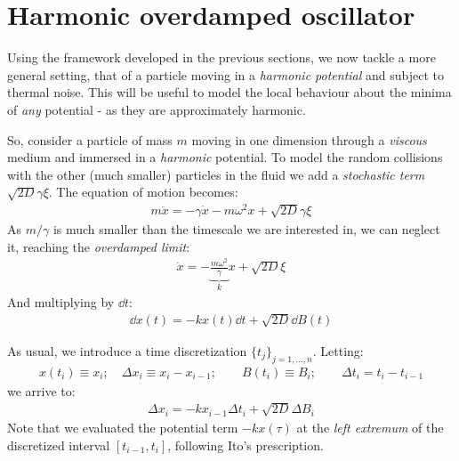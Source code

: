 \documentclass[../template.tex]{subfiles}
\begin{document}
\section{Harmonic overdamped oscillator}
Using the framework developed in the previous sections, we now tackle a more general setting, that of a particle moving in a \textit{harmonic potential} and subject to thermal noise. This will be useful to model the local behaviour about the minima of \textit{any} potential - as they are approximately harmonic.

So, consider a particle of mass $m$ moving in one dimension through a \textit{viscous} medium and immersed in a \textit{harmonic} potential. To model the random collisions with the other (much smaller) particles in the fluid we add a \textit{stochastic term} $\sqrt{2D}\gamma\xi$. The equation of motion becomes:
\begin{align}\label{eqn:motion-harmonic}
    m\ddot{x} = - \gamma \dot{x} - m \omega^2 x + \sqrt{2D} \gamma \xi
\end{align}
As $m/\gamma$ is much smaller than the timescale we are interested in, we can neglect it, reaching the \textit{overdamped limit}:
\begin{align*}
    \dot{x} = -\underbrace{\frac{m \omega^2}{\gamma}}_{k} x + \sqrt{2D} \xi  
\end{align*} 
And multiplying by $\dd{t}$:
\begin{align}
    \dd{x(t)} = -kx(t) \dd{t} + \sqrt{2D} \dd{B(t)} \label{eqn:sde1}
\end{align}

As usual, we introduce a time discretization $\{t_j\}_{j=1,\dots,n}$. Letting:
\begin{align*}
    x(t_i) \equiv x_i; \quad \Delta x_i \equiv x_{i} - x_{i-1}; \qquad B(t_i) \equiv B_i; \qquad \Delta t_i = t_{i} - t_{i-1}
\end{align*}
we arrive to:
\begin{align}
    \Delta x_i = -k x_{i-1} \Delta t_i + \sqrt{2D} \Delta B_i \label{eqn:discrete-harmonic}
\end{align}
Note that we evaluated the potential term $-kx(\tau)$ at the \textit{left extremum} of the discretized interval $[t_{i-1},t_i]$, following Ito's prescription.
\end{document}

